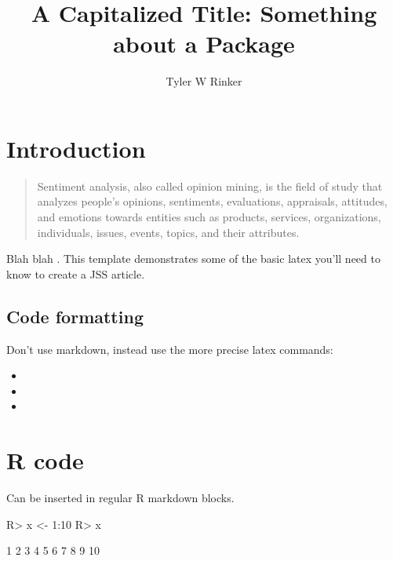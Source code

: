 \documentclass[article]{jss}
\author{
Tyler W Rinker\\
}
\title{A Capitalized Title: Something about a Package \pkg{sentimentr}}
\providecommand{\tightlist}{%
  \setlength{\itemsep}{0pt}\setlength{\parskip}{0pt}}
\begin{document}
\section{Introduction}\label{introduction}

\begin{quote}
Sentiment analysis, also called opinion mining, is the field of study
that analyzes people's opinions, sentiments, evaluations, appraisals,
attitudes, and emotions towards entities such as products, services,
organizations, individuals, issues, events, topics, and their
attributes. \citep[p.~1]{Liu2012}
\end{quote}

Blah blah
\citetext{\citealp[see][pp.~33-35]{Rinker2017}; \citealp[also][ch.~1]{Rinker2017b}}.
This template demonstrates some of the basic latex you'll need to know
to create a JSS article.

\subsection{Code formatting}\label{code-formatting}

Don't use markdown, instead use the more precise latex commands:

\begin{itemize}
\tightlist
\item
\item
\item
\end{itemize}

\section{R code}\label{r-code}

Can be inserted in regular R markdown blocks.

\begin{CodeChunk}

\begin{CodeInput}
R> x <- 1:10
R> x
\end{CodeInput}

\begin{CodeOutput}
 [1]  1  2  3  4  5  6  7  8  9 10
\end{CodeOutput}
\end{CodeChunk}


\end{document}
